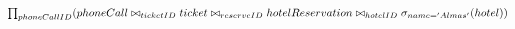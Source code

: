 \setLTR
$
\prod_{phoneCallID}( \\phoneCall \bowtie_{ticketID}ticket\bowtie_{reserveID}hotelReservation \bowtie_{hotelID}\sigma_{name='Almas'}(hotel))
\\ \\$
\setRTL